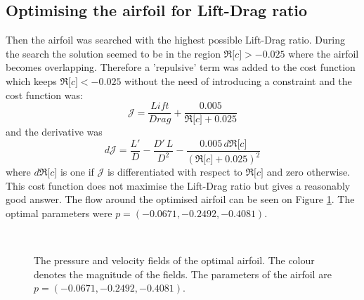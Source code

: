\documentclass[12pt, a4paper]{article}
\begin{document}
\subsection{Optimising the airfoil for Lift-Drag ratio}
Then the airfoil was searched with the highest possible Lift-Drag ratio. During the search the solution seemed to be in the region $\Re \lbrack c \rbrack > -0.025$ where the airfoil becomes overlapping. Therefore a 'repulsive' term was added to the cost function which keeps $\Re \lbrack c \rbrack < -0.025$ without the need of introducing a constraint and the cost function was:
\begin{equation}
\mathcal{J} = \frac{Lift}{Drag} + \frac{0.005}{\Re \lbrack c \rbrack + 0.025}
\end{equation}
and the derivative was
\begin{equation}
d \mathcal{J} = \frac{L'}{D} - \frac{D' \, L}{D^2} - \frac{0.005 \, d \Re \lbrack c \rbrack }{(\Re \lbrack c \rbrack + 0.025)^2}
\end{equation}
where $d \Re \lbrack c \rbrack$ is one if $\mathcal{J}$ is differentiated with respect to $\Re \lbrack c \rbrack$ and zero otherwise. This cost function does not maximise the Lift-Drag ratio but gives a reasonably good answer. The flow around the optimised airfoil can be seen on Figure \ref{fig_opt_joukow}. The optimal parameters were $p = (-0.0671,-0.2492,-0.4081)$.
\begin{figure}[htbp]
    \centering
     \\
    \caption{The pressure and velocity fields of the optimal airfoil. The colour denotes the magnitude of the fields. The parameters of the airfoil are $p = (-0.0671,-0.2492,-0.4081)$.}
    \label{fig_opt_joukow}
\end{figure}
\end{document}
